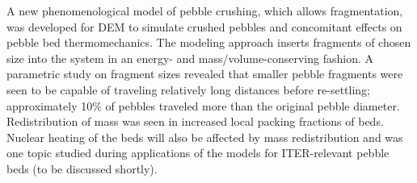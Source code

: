 A new phenomenological model of pebble crushing, which allows fragmentation, was developed for DEM to simulate crushed pebbles and concomitant effects on pebble bed thermomechanics. The modeling approach inserts fragments of chosen size into the system in an energy- and mass/volume-conserving fashion. A parametric study on fragment sizes revealed that smaller pebble fragments were seen to be capable of traveling relatively long distances before re-settling; approximately 10\% of pebbles traveled more than the original pebble diameter. Redistribution of mass was seen in increased local packing fractions of beds. Nuclear heating of the beds will also be affected by mass redistribution and was one topic studied during applications of the models for ITER-relevant pebble beds (to be discussed shortly). %

